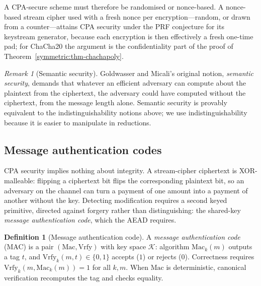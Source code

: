 \documentclass[11pt,a4paper]{article}
\theoremstyle{definition}
\newtheorem{definition}[theorem]{Definition}
\theoremstyle{remark}
\newtheorem{remark}[theorem]{Remark}
\begin{document}
A CPA-secure scheme must therefore be randomised or nonce-based. A
nonce-based stream cipher used with a fresh nonce per
encryption---random, or drawn from a counter---attains CPA security
under the PRF conjecture for its keystream generator, because each
encryption is then effectively a fresh one-time pad; for \textsf{ChaCha20}
the argument is the confidentiality part of the proof of
Theorem~\ref{symmetric:thm-chachapoly}.

\begin{remark}[Semantic security]\label{symmetric:rem-semantic}
Goldwasser and Micali's original notion, \emph{semantic security},
demands that whatever an efficient adversary can compute about the
plaintext from the ciphertext, the adversary could have computed
without the ciphertext, from the message length alone. Semantic security is
provably equivalent to the indistinguishability notions above; we use
indistinguishability because it is easier to manipulate in reductions.
\end{remark}

\subsection{Message authentication codes}\label{symmetric:subsec:mac}

CPA security implies nothing about integrity. A stream-cipher
ciphertext is XOR-malleable: flipping a ciphertext bit flips the
corresponding plaintext bit, so an adversary on the channel can turn
a payment of one amount into a payment of another without the key.
Detecting modification requires a second keyed primitive, directed
against forgery rather than distinguishing: the shared-key
\emph{message authentication code}, which the AEAD requires.

\begin{definition}[Message authentication code]\label{symmetric:def-mac}
A \emph{message authentication code} (MAC) is a pair
\((\mathrm{Mac}, \mathrm{Vrfy})\) with key space \(\mathcal{K}\):
algorithm \(\mathrm{Mac}_{k}(m)\) outputs a tag \(t\), and
\(\mathrm{Vrfy}_{k}(m, t) \in \{0,1\}\) accepts (\(1\)) or rejects
(\(0\)). Correctness requires
\(\mathrm{Vrfy}_{k}(m, \mathrm{Mac}_{k}(m)) = 1\) for all \(k, m\).
When \(\mathrm{Mac}\) is deterministic, canonical verification
recomputes the tag and checks equality.
\end{definition}
\end{document}
